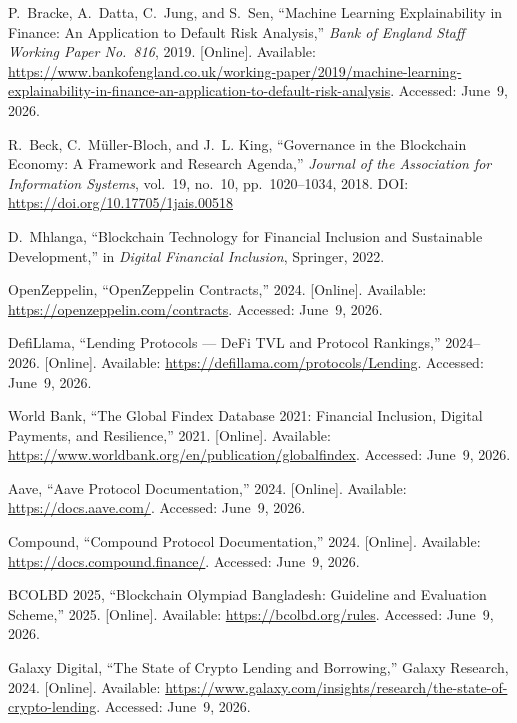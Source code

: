 \documentclass[12pt,a4paper]{report}
\begin{document}
{\begin{enumerate}[label={[\arabic*]}]
\item P.~Bracke, A.~Datta, C.~Jung, and S.~Sen, ``Machine Learning Explainability in Finance: An Application to Default Risk Analysis,'' \textit{Bank of England Staff Working Paper No.~816}, 2019. [Online]. Available: \url{https://www.bankofengland.co.uk/working-paper/2019/machine-learning-explainability-in-finance-an-application-to-default-risk-analysis}. Accessed: June~9, 2026.
\item R.~Beck, C.~M\"{u}ller-Bloch, and J.~L. King, ``Governance in the Blockchain Economy: A Framework and Research Agenda,'' \textit{Journal of the Association for Information Systems}, vol.~19, no.~10, pp.~1020--1034, 2018. DOI: \url{https://doi.org/10.17705/1jais.00518}

\item D.~Mhlanga, ``Blockchain Technology for Financial Inclusion and Sustainable Development,'' in \textit{Digital Financial Inclusion}, Springer, 2022.

\item OpenZeppelin, ``OpenZeppelin Contracts,'' 2024. [Online]. Available: \url{https://openzeppelin.com/contracts}. Accessed: June~9, 2026.

\item DefiLlama, ``Lending Protocols --- DeFi TVL and Protocol Rankings,'' 2024--2026. [Online]. Available: \url{https://defillama.com/protocols/Lending}. Accessed: June~9, 2026.
\item World Bank, ``The Global Findex Database 2021: Financial Inclusion, Digital Payments, and Resilience,'' 2021. [Online]. Available: \url{https://www.worldbank.org/en/publication/globalfindex}. Accessed: June~9, 2026.

\item Aave, ``Aave Protocol Documentation,'' 2024. [Online]. Available: \url{https://docs.aave.com/}. Accessed: June~9, 2026.

\item Compound, ``Compound Protocol Documentation,'' 2024. [Online]. Available: \url{https://docs.compound.finance/}. Accessed: June~9, 2026.

\item BCOLBD 2025, ``Blockchain Olympiad Bangladesh: Guideline and Evaluation Scheme,'' 2025. [Online]. Available: \url{https://bcolbd.org/rules}. Accessed: June~9, 2026.
\item Galaxy Digital, ``The State of Crypto Lending and Borrowing,'' Galaxy Research, 2024. [Online]. Available: \url{https://www.galaxy.com/insights/research/the-state-of-crypto-lending}. Accessed: June~9, 2026.


\end{enumerate}}
\end{document}
